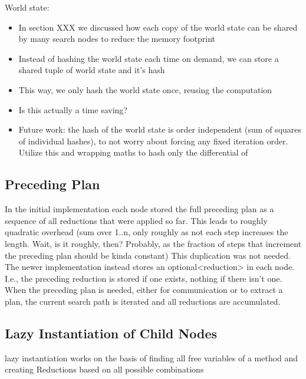 World state:
\begin{itemize}
	\item In section XXX  we discussed how each copy of the world state can be shared by many search nodes to reduce the memory footprint
	\item Instead of hashing the world state each time on demand, we can store a shared tuple of world state and it's hash
	\item This way, we only hash the world state once, reusing the computation
	\item Is this actually a time saving?
	\item Future work: the hash of the world state is order independent (sum of squares of individual hashes), to not worry about forcing any fixed iteration order. Utilize this and wrapping maths to hash only the differential of 
\end{itemize}

\subsection{Preceding Plan}
In the initial implementation each node stored the full preceding plan as a sequence of all reductions that were applied so far. This leads to roughly quadratic overhead (sum over 1..n, only roughly as not each step increases the length. Wait, is it roughly, then? Probably, as the fraction of steps that increment the preceding plan should be kinda constant)
This duplication was not needed. The newer implementation instead stores an optional<reduction> in each node. I.e., the preceding reduction is stored if one exists, nothing if there isn't one. When the preceding plan is needed, either for communication or to extract a plan, the current search path is iterated and all reductions are accumulated.

\subsection{Lazy Instantiation of Child Nodes}
lazy instantiation works on the basis of finding all free variables of a method and creating Reductions based on all possible combinations

